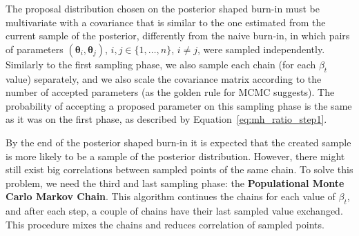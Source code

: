 The proposal distribution chosen on the posterior shaped burn-in must be 
multivariate with a covariance that is similar to the one estimated from 
the current sample of the posterior, differently from the naive burn-in, 
in which pairs of parameters $({\bm \theta_i}, {\bm \theta_j})$, $i, j 
\in \{1, \ldots, n\}$, $i \neq j$, were sampled independently. Similarly
to the first sampling phase, we also sample each chain (for each
$\beta_t$ value) separately, and we also scale the covariance matrix
according to the number of accepted parameters (as the golden rule for
MCMC suggests). The probability of accepting a proposed parameter on
this sampling phase is the same as it was on the first phase, as 
described by Equation~\ref{eq:mh_ratio_step1}.

By the end of the posterior shaped burn-in it is expected that the
created sample is more likely to be a sample of the posterior
distribution. However, there might still exist big correlations between
sampled points of the same chain. To solve this problem, we need the
third and last sampling phase: the {\bf Populational Monte Carlo Markov
Chain}. This algorithm continues the chains for each value of $\beta_t$,
and after each step, a couple of chains have their last sampled value
exchanged. This procedure mixes the chains and reduces correlation of
sampled points.


